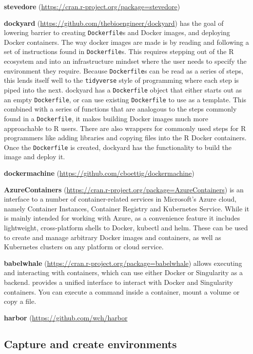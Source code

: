 \textbf{stevedore} (\url{https://cran.r-project.org/package=stevedore})

\textbf{dockyard} (\url{https://github.com/thebioengineer/dockyard}) has
the goal of lowering barrier to creating \texttt{Dockerfile}s and Docker
images, and deploying Docker containers. The way docker images are made
is by reading and following a set of instructions found in
\texttt{Dockerfile}s. This requires stepping out of the R ecosystem and
into an infrastructure mindset where the user needs to specify the
environment they require. Because \texttt{Dockerfile}s can be read as a
series of steps, this lends itself well to the \texttt{tidyverse} style
of programming where each step is piped into the next. dockyard has a
\texttt{Dockerfile} object that either starts out as an empty
\texttt{Dockerfile}, or can use existing \texttt{Dockerfile} to use as a
template. This combined with a series of functions that are analogous to
the steps commonly found in a \texttt{Dockerfile}, it makes building
Docker images much more approachable to R users. There are also wrappers
for commonly used steps for R programmers like adding libraries and
copying files into the R Docker containers. Once the \texttt{Dockerfile}
is created, dockyard has the functionality to build the image and deploy
it.

\textbf{dockermachine} (\url{https://github.com/cboettig/dockermachine})

\textbf{AzureContainers}
(\url{https://cran.r-project.org/package=AzureContainers}) is an
interface to a number of container-related services in Microsoft's Azure
cloud, namely Container Instances, Container Registry and Kubernetes
Service. While it is mainly intended for working with Azure, as a
convenience feature it includes lightweight, cross-platform shells to
Docker, kubectl and helm. These can be used to create and manage
arbitrary Docker images and containers, as well as Kubernetes clusters
on any platform or cloud service.

\textbf{babelwhale}
(\url{https://cran.r-project.org/package=babelwhale}) allows executing
and interacting with containers, which can use either Docker or
Singularity as a backend. provides a unified interface to interact with
Docker and Singularity containers. You can execute a command inside a
container, mount a volume or copy a file.

\textbf{harbor} (\url{https://github.com/wch/harbor}

\hypertarget{capture-and-create-environments-nuest}{%
\subsection{\texorpdfstring{Capture and create environments
\citep{nuest}}{Capture and create environments {[}@nuest{]}}}\label{capture-and-create-environments-nuest}}

